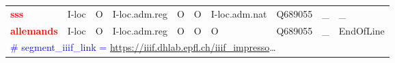 \begin{table}
{\begin{tabular}{l|ll|lll|l|ll|l}
            \textbf{\textcolor{red}{sss}}       & I-loc                          & O                            & I-loc.adm.reg & O                        & O    & I-loc.adm.nat & Q689055 & \_   & \_           \\
            \textbf{\textcolor{red}{allemands}} & I-loc                          & O                            & I-loc.adm.reg & O                        & O    & O             & Q689055 & \_   & EndOfLine    \\

            \multicolumn{10}{l}{\textcolor{blue}{\# segment\_iiif\_link = \url{https://iiif.dhlab.epfl.ch/iiif_impresso}}\dots}                                                                                   \\%


\end{tabular}}
\end{table}
